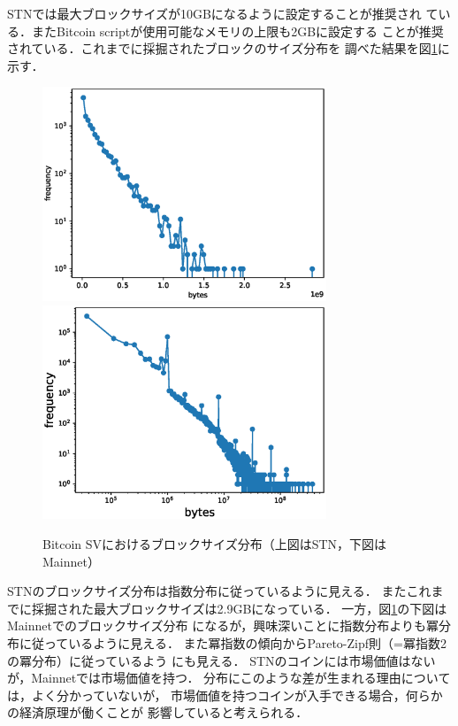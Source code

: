 \documentclass[graybox]{svmult}
\begin{document}
STNでは最大ブロックサイズが10GBになるように設定することが推奨され
ている．またBitcoin scriptが使用可能なメモリの上限も2GBに設定する
ことが推奨されている．これまでに採掘されたブロックのサイズ分布を
調べた結果を図\ref{fig:block_size}に示す．
%
\begin{figure}[tb]
  \vspace{-20mm}
  \begin{center}
    \includegraphics[width=85mm]{bsv_stn-block_bytes-semilogy2.eps}
    \includegraphics[width=85mm]{bsv_mainnet-block_bytes-loglog.eps}
  \end{center}
  \vspace{20mm}
  \caption{Bitcoin SVにおけるブロックサイズ分布（上図はSTN，下図はMainnet）}
  \label{fig:block_size}
\end{figure}
%
STNのブロックサイズ分布は指数分布に従っているように見える．
またこれまでに採掘された最大ブロックサイズは2.9GBになっている．
一方，図\ref{fig:block_size}の下図はMainnetでのブロックサイズ分布
になるが，興味深いことに指数分布よりも冪分布に従っているように見える．
また冪指数の傾向からPareto-Zipf則（=冪指数2の冪分布）に従っているよう
にも見える．
STNのコインには市場価値はないが，Mainnetでは市場価値を持つ．
分布にこのような差が生まれる理由については，よく分かっていないが，
市場価値を持つコインが入手できる場合，何らかの経済原理が働くことが
影響していると考えられる．
\end{document}
